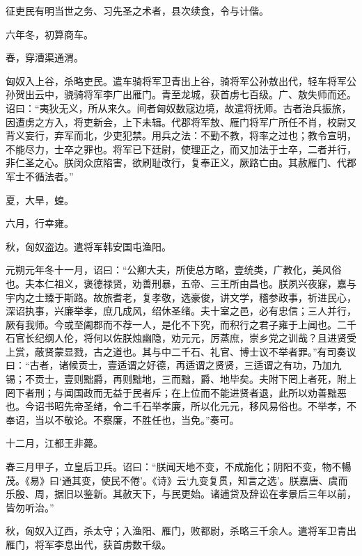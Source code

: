 \documentclass[12pt,UTF8]{ctexbook}
\begin{document}
征吏民有明当世之务、习先圣之术者，县次续食，令与计偕。



六年冬，初算商车。



春，穿漕渠通渭。



匈奴入上谷，杀略吏民。遣车骑将军卫青出上谷，骑将军公孙敖出代，轻车将军公孙贺出云中，骁骑将军李广出雁门。青至龙城，获首虏七百级。广、敖失师而还。诏曰：“夷狄无义，所从来久。间者匈奴数寇边境，故遣将抚师。古者治兵振旅，因遭虏之方入，将吏新会，上下未辑。代郡将军敖、雁门将军广所任不肖，校尉又背义妄行，弃军而北，少吏犯禁。用兵之法：不勤不教，将率之过也；教令宣明，不能尽力，士卒之罪也。将军已下廷尉，使理正之，而又加法于士卒，二者并行，非仁圣之心。朕闵众庶陷害，欲刷耻改行，复奉正义，厥路亡由。其赦雁门、代郡军士不循法者。”



夏，大旱，蝗。



六月，行幸雍。



秋，匈奴盗边。遣将军韩安国屯渔阳。



元朔元年冬十一月，诏曰：“公卿大夫，所使总方略，壹统类，广教化，美风俗也。夫本仁祖义，褒德禄贤，劝善刑暴，五帝、三王所由昌也。朕夙兴夜寐，嘉与宇内之士臻于斯路。故旅耆老，复孝敬，选豪俊，讲文学，稽参政事，祈进民心，深诏执事，兴廉举孝，庶几成风，绍休圣绪。夫十室之邑，必有忠信；三人并行，厥有我师。今或至阖郡而不荐一人，是化不下究，而积行之君子雍于上闻也。二千石官长纪纲人伦，将何以佐朕烛幽隐，劝元元，厉蒸庶，崇乡党之训哉？且进贤受上赏，蔽贤蒙显戮，古之道也。其与中二千石、礼官、博士议不举者罪。”有司奏议曰：“古者，诸候贡士，壹适谓之好德，再适谓之贤贤，三适谓之有功，乃加九锡；不贡士，壹则黜爵，再则黜地，三而黜，爵、地毕矣。夫附下罔上者死，附上罔下者刑；与闻国政而无益于民者斥；在上位而不能进贤者退，此所以劝善黜恶也。今诏书昭先帝圣绪，令二千石举孝廉，所以化元元，移风易俗也。不举孝，不奉诏，当以不敬论。不察廉，不胜任也，当免。”奏可。



十二月，江都王非薨。



春三月甲子，立皇后卫兵。诏曰：“朕闻天地不变，不成施化；阴阳不变，物不暢茂。《易》曰‘通其变，使民不倦’。《诗》云‘九变复贯，知言之选’。朕嘉唐、虞而乐殷、周，据旧以鉴新。其赦天下，与民更始。诸逋贷及辞讼在孝景后三年以前，皆勿听治。”



秋，匈奴入辽西，杀太守；入渔阳、雁门，败都尉，杀略三千余人。遣将军卫青出雁门，将军李息出代，获首虏数千级。
\end{document}
